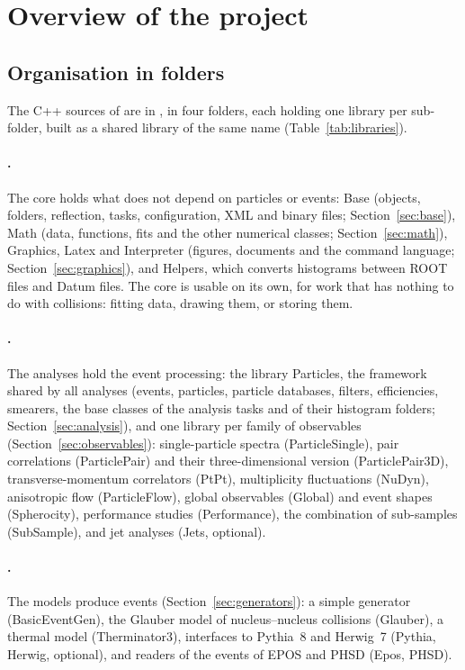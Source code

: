 \section{Overview of the project}
\label{sec:overview}

\subsection{Organisation in folders}
\label{sec:folders}

The C++ sources of \Datum{} are in , in four folders, each holding one library per sub-folder, built as a
shared library of the same name (Table~\ref{tab:libraries}).

\paragraph{.}
The core holds what does not depend on particles or events: Base (objects, folders, reflection, tasks, configuration,
XML and binary files; Section~\ref{sec:base}), Math (data, functions, fits and the other numerical classes;
Section~\ref{sec:math}), Graphics, Latex and Interpreter (figures, documents and the command language;
Section~\ref{sec:graphics}), and Helpers, which converts histograms between ROOT files and Datum files. The core is
usable on its own, for work that has nothing to do with collisions: fitting data, drawing them, or storing them.

\paragraph{.}
The analyses hold the event processing: the library Particles, the framework shared by all analyses (events,
particles, particle databases, filters, efficiencies, smearers, the base classes of the analysis tasks and of their
histogram folders; Section~\ref{sec:analysis}), and one library per family of observables (Section~\ref{sec:observables}):
single-particle spectra (ParticleSingle), pair correlations (ParticlePair) and their three-dimensional version
(ParticlePair3D), transverse-momentum correlators (PtPt), multiplicity fluctuations (NuDyn), anisotropic flow
(ParticleFlow), global observables (Global) and event shapes (Spherocity), performance studies (Performance), the
combination of sub-samples (SubSample), and jet analyses (Jets, optional).

\paragraph{.}
The models produce events (Section~\ref{sec:generators}): a simple generator (BasicEventGen), the Glauber model of
nucleus--nucleus collisions (Glauber), a thermal model (Therminator3), interfaces to Pythia~8 and Herwig~7 (Pythia,
Herwig, optional), and readers of the events of EPOS and PHSD (Epos, PHSD).

